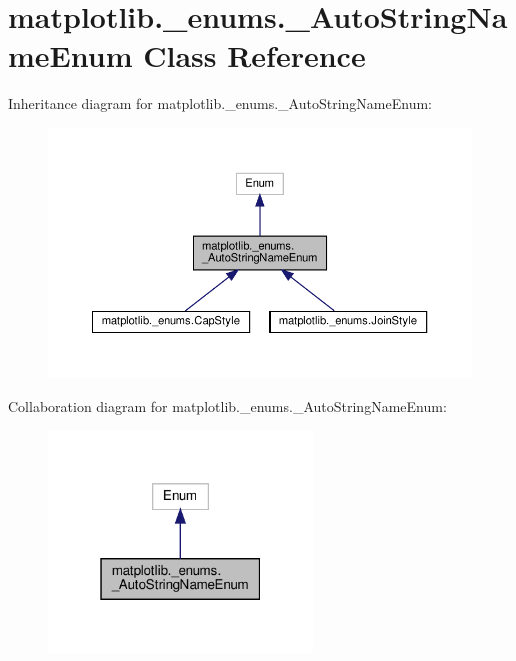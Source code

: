 \hypertarget{classmatplotlib_1_1__enums_1_1__AutoStringNameEnum}{}\section{matplotlib.\+\_\+enums.\+\_\+\+Auto\+String\+Name\+Enum Class Reference}
\label{classmatplotlib_1_1__enums_1_1__AutoStringNameEnum}


Inheritance diagram for matplotlib.\+\_\+enums.\+\_\+\+Auto\+String\+Name\+Enum\+:
\nopagebreak
\begin{figure}[H]
\begin{center}
\leavevmode
\includegraphics[width=350pt]{classmatplotlib_1_1__enums_1_1__AutoStringNameEnum__inherit__graph}
\end{center}
\end{figure}


Collaboration diagram for matplotlib.\+\_\+enums.\+\_\+\+Auto\+String\+Name\+Enum\+:
\nopagebreak
\begin{figure}[H]
\begin{center}
\leavevmode
\includegraphics[width=199pt]{classmatplotlib_1_1__enums_1_1__AutoStringNameEnum__coll__graph}
\end{center}
\end{figure}
